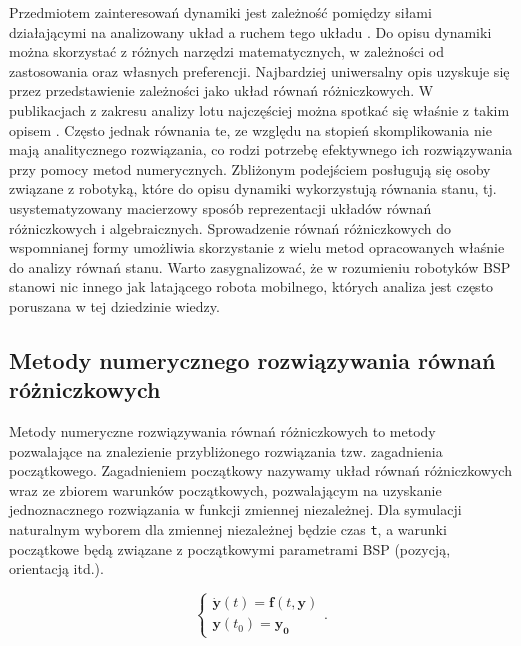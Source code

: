 Przedmiotem zainteresowań dynamiki jest zależność pomiędzy siłami działającymi na analizowany układ a ruchem tego układu \cite{mw}.  Do opisu dynamiki można skorzystać z różnych narzędzi matematycznych, w zależności od zastosowania oraz własnych preferencji. Najbardziej uniwersalny opis uzyskuje się przez przedstawienie zależności jako układ równań różniczkowych. W publikacjach z zakresu analizy lotu najczęściej można spotkać się właśnie z takim opisem \cite{energies}\cite{quaterion}. Często jednak równania te, ze względu na stopień skomplikowania nie mają analitycznego rozwiązania, co rodzi potrzebę efektywnego ich rozwiązywania przy pomocy metod numerycznych. Zbliżonym podejściem posługują się osoby związane z robotyką, które do opisu dynamiki wykorzystują równania stanu, tj. usystematyzowany macierzowy sposób reprezentacji układów równań różniczkowych i algebraicznych. Sprowadzenie równań różniczkowych do wspomnianej formy umożliwia skorzystanie z wielu metod opracowanych właśnie do analizy równań stanu. Warto zasygnalizować, że w rozumieniu robotyków BSP stanowi nic innego jak latającego robota mobilnego, których analiza jest często poruszana w tej dziedzinie wiedzy.

\subsection{Metody numerycznego rozwiązywania równań różniczkowych}

Metody numeryczne rozwiązywania równań różniczkowych to metody pozwalające na znalezienie przybliżonego rozwiązania tzw. zagadnienia początkowego. Zagadnieniem początkowy nazywamy układ równań różniczkowych wraz ze zbiorem warunków początkowych, pozwalającym na uzyskanie jednoznacznego rozwiązania w funkcji zmiennej niezależnej. Dla symulacji naturalnym wyborem dla zmiennej niezależnej będzie czas \texttt{t}, a warunki początkowe będą związane z początkowymi parametrami BSP (pozycją, orientacją itd.).

\[
	\begin{cases}
		\dot{\bm{y}} \left( t \right)  = \bm{f} \left( t,\bm{y}\right) \\
		\bm{y} \left( t_0 \right) = \bm{y_0}
	\end{cases}.
\]

